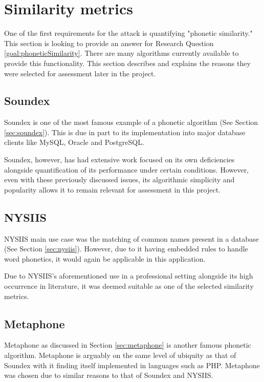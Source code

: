 \section{Similarity metrics}
\label{sec:metrics}
One of the first requirements for the attack is quantifying "phonetic similarity." This section is looking to provide an answer for Research Question \ref{goal:phoneticSimilarity}. There are many algorithms currently available to provide this functionality. This section describes and explains the reasons they were selected for assessment later in the project.

\subsection{Soundex}
Soundex is one of the most famous example of a phonetic algorithm (See Section \ref{sec:soundex}). This is due in part to its implementation into major database clients like MySQL\cite{mysql_soundex}, Oracle\cite{moved_2005} and PostgreSQL\cite{postgresql}.

Soundex, however, has had extensive work focused on its own deficiencies alongside quantification of its performance under certain conditions. However, even with these previously discussed issues, its algorithmic simplicity and popularity allows it to remain relevant for assessment in this project.

\subsection{NYSIIS}
NYSIIS main use case was the matching of common names present in a database (See Section \ref{sec:nysiis}). However, due to it having embedded rules to handle word phonetics, it would again be applicable in this application.

Due to NYSIIS's aforementioned use in a professional setting alongside its high occurrence in literature, it was deemed suitable as one of the selected similarity metrics.

\subsection{Metaphone}
Metaphone as discussed in Section \ref{sec:metaphone} is another famous phonetic algorithm. Metaphone is arguably on the same level of ubiquity as that of Soundex with it finding itself implemented in languages such as PHP\cite{php}. Metaphone was chosen due to similar reasons to that of Soundex and NYSIIS. 

